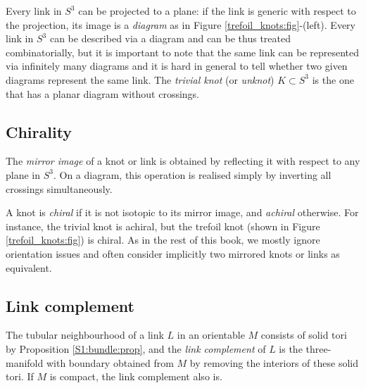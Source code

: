 Every link in $S^3$ can be projected to a plane: if the link is generic with respect to the projection, its image is a \emph{diagram} as in Figure \ref{trefoil_knots:fig}-(left). Every link in $S^3$ can be described via a diagram and can be thus treated combinatorially, but it is important to note that the same link can be represented via infinitely many diagrams and it is hard in general to tell whether two given diagrams represent the same link. The \emph{trivial knot} (or \emph{unknot}) $K\subset S^3$ is the one that has a planar diagram without crossings.

\subsection{Chirality}
The \emph{mirror image} of a knot or link is obtained by reflecting it with respect to any plane in $S^3$. On a diagram, this operation is realised simply by inverting all crossings simultaneously.

A knot is \emph{chiral} if it is not isotopic to its mirror image, and \emph{achiral} otherwise. For instance, the trivial knot is achiral, but the trefoil knot (shown in Figure \ref{trefoil_knots:fig}) is chiral.
As in the rest of this book, we mostly ignore orientation issues and often consider implicitly two mirrored knots or links as equivalent.

\subsection{Link complement}
The tubular neighbourhood of a link $L$ in an orientable $M$ consists of solid tori by Proposition \ref{S1:bundle:prop}, and the \emph{link complement} of $L$ is the three-manifold with boundary obtained from $M$ by removing the interiors of these solid tori. If $M$ is compact, the link complement also is.

